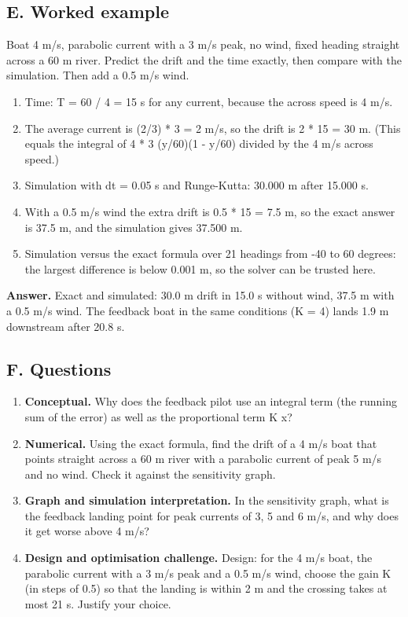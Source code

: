 \documentclass[11pt,a4paper]{article}
\begin{document}
\subsection*{E. Worked example}
Boat 4 m/s, parabolic current with a 3 m/s peak, no wind, fixed heading straight across a 60 m river. Predict the drift and the time exactly, then compare with the simulation. Then add a 0.5 m/s wind.
\begin{enumerate}[nosep]
\item Time: T = 60 / 4 = 15 s for any current, because the across speed is 4 m/s.
\item The average current is (2/3) * 3 = 2 m/s, so the drift is 2 * 15 = 30 m. (This equals the integral of 4 * 3 (y/60)(1 - y/60) divided by the 4 m/s across speed.)
\item Simulation with dt = 0.05 s and Runge-Kutta: 30.000 m after 15.000 s.
\item With a 0.5 m/s wind the extra drift is 0.5 * 15 = 7.5 m, so the exact answer is 37.5 m, and the simulation gives 37.500 m.
\item Simulation versus the exact formula over 21 headings from -40 to 60 degrees: the largest difference is below 0.001 m, so the solver can be trusted here.
\end{enumerate}
\textbf{Answer.} Exact and simulated: 30.0 m drift in 15.0 s without wind, 37.5 m with a 0.5 m/s wind. The feedback boat in the same conditions (K = 4) lands 1.9 m downstream after 20.8 s.

\subsection*{F. Questions}
\begin{enumerate}[nosep]
\item \textbf{Conceptual.} Why does the feedback pilot use an integral term (the running sum of the error) as well as the proportional term K x?
\item \textbf{Numerical.} Using the exact formula, find the drift of a 4 m/s boat that points straight across a 60 m river with a parabolic current of peak 5 m/s and no wind. Check it against the sensitivity graph.
\item \textbf{Graph and simulation interpretation.} In the sensitivity graph, what is the feedback landing point for peak currents of 3, 5 and 6 m/s, and why does it get worse above 4 m/s?
\item \textbf{Design and optimisation challenge.} Design: for the 4 m/s boat, the parabolic current with a 3 m/s peak and a 0.5 m/s wind, choose the gain K (in steps of 0.5) so that the landing is within 2 m and the crossing takes at most 21 s. Justify your choice.
\end{enumerate}
\end{document}
